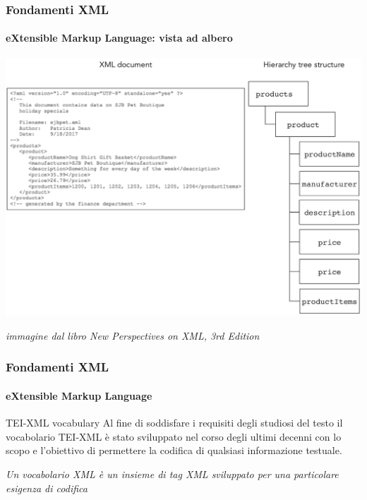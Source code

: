 \begin{frame}
	\frametitle{Fondamenti XML}
	\framesubtitle{eXtensible Markup Language: vista ad albero}
	\addtocounter{nframe}{1}

	\begin{center}
		\includegraphics[width=.9\textwidth]{imgs/XML-TreeStructure.png}
	\end{center}

\begin{tiny}\textit{immagine dal libro New Perspectives on XML, 3rd Edition}\end{tiny}

\end{frame}

\begin{frame}
	\frametitle{Fondamenti XML}
	\framesubtitle{eXtensible Markup Language}
	\addtocounter{nframe}{1}

	\begin{block}{TEI-XML vocabulary}
		Al fine di soddisfare i requisiti degli studiosi del testo il vocabolario TEI-XML è stato sviluppato nel corso degli ultimi decenni con lo scopo e l'obiettivo di permettere la codifica di qualsiasi informazione testuale.
	\end{block}
	
	\textit{Un vocabolario XML è un insieme di tag XML sviluppato per una particolare esigenza di codifica}

\end{frame}


